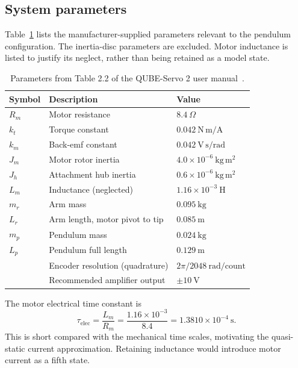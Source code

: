 \subsection{System parameters}

Table~\ref{tab:params} lists the manufacturer-supplied parameters relevant
to the pendulum configuration. The inertia-disc parameters are excluded.
Motor inductance is listed to justify its neglect, rather than being
retained as a model state.
\begin{table}[H]\centering
\caption{Parameters from Table 2.2 of the QUBE-Servo 2 user manual~\cite{qube_manual}.}
\label{tab:params}
\begin{tabular}{lll}
\toprule
\textbf{Symbol}&\textbf{Description}&\textbf{Value}\\
\midrule
$R_m$&Motor resistance&$8.4~\Omega$\\
$k_t$&Torque constant&$0.042~\mathrm{N\,m/A}$\\
$k_m$&Back-emf constant&$0.042~\mathrm{V\,s/rad}$\\
$J_m$&Motor rotor inertia&$4.0\times10^{-6}~\mathrm{kg\,m^2}$\\
$J_h$&Attachment hub inertia&$0.6\times10^{-6}~\mathrm{kg\,m^2}$\\
$L_m$&Inductance (neglected)&$1.16\times10^{-3}~\mathrm H$\\
$m_r$&Arm mass&$0.095~\mathrm{kg}$\\
$L_r$&Arm length, motor pivot to tip&$0.085~\mathrm m$\\
$m_p$&Pendulum mass&$0.024~\mathrm{kg}$\\
$L_p$&Pendulum full length&$0.129~\mathrm m$\\
&Encoder resolution (quadrature)&$2\pi/2048~\mathrm{rad/count}$\\
&Recommended amplifier output&$\pm10~\mathrm V$\\
\bottomrule
\end{tabular}
\end{table}
The motor electrical time constant is
\begin{equation}
\tau_{\mathrm{elec}}=\frac{L_m}{R_m}
=\frac{1.16\times10^{-3}}{8.4}
=1.3810\times10^{-4}~\mathrm s.
\end{equation}
This is short compared with the mechanical time scales, motivating the
quasi-static current approximation. Retaining inductance would introduce
motor current as a fifth state.

